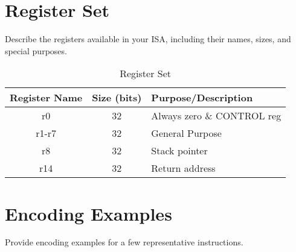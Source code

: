 \documentclass[a4paper,11pt]{article}
\begin{document}
	
	\section*{Register Set}
	Describe the registers available in your ISA, including their names, sizes, and special purposes.
	
	\begin{table}[h!]
		\centering
		\begin{tabular}{|c|c|p{8cm}|}
			\hline
			\textbf{Register Name} & \textbf{Size (bits)} & \textbf{Purpose/Description} \\
			\hline
			r0                    & 32                   & Always zero \& CONTROL reg\\
			\hline
			r1-r7                 & 32                   & General Purpose\\
			\hline
			r8                    & 32                   & Stack pointer \\
			\hline
			r14                   & 32                   & Return address \\
			\hline
		\end{tabular}
		\caption{Register Set}
		\label{tab:register_set}
	\end{table}
	
		\section*{Encoding Examples}
	Provide encoding examples for a few representative instructions.
	
\end{document}

